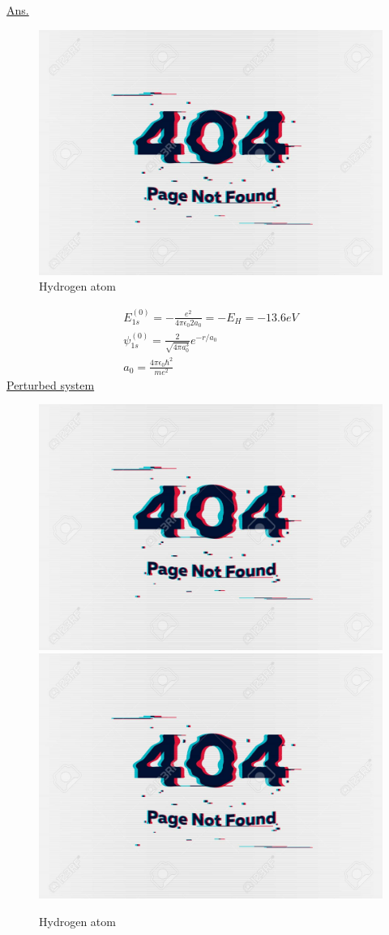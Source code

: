\begin{enumerate}[label=Problem.\arabic*,start=1]
			\underline{Ans.}\\
			
			\begin{figure}
				\centering
				\includegraphics[width=0.5\linewidth]{Pictures/not-found.jpg}
				\caption{Hydrogen atom}
			\end{figure}
		
			\begin{align*}
				E_{1 s}^{(0)} = -\frac{e^2}{4\pi \epsilon_0 2 a_0} = - E_H = - 13.6 eV \\
				\psi_{1 s}^{(0)} = \frac{2}{\sqrt{4 \pi a_0^3} } e^{-r/a_0}\\
				a_0 = \frac{4 \pi \epsilon_0 \hbar^2}{m e^2}
			\end{align*}
			\underline{Perturbed system}
			
			\begin{figure}
				\centering
				\includegraphics[width=0.5\linewidth]{Pictures/not-found.jpg}
				\includegraphics[width=0.5\linewidth]{Pictures/not-found.jpg}
				\caption{Hydrogen atom}
			\end{figure}
		

\end{enumerate}
